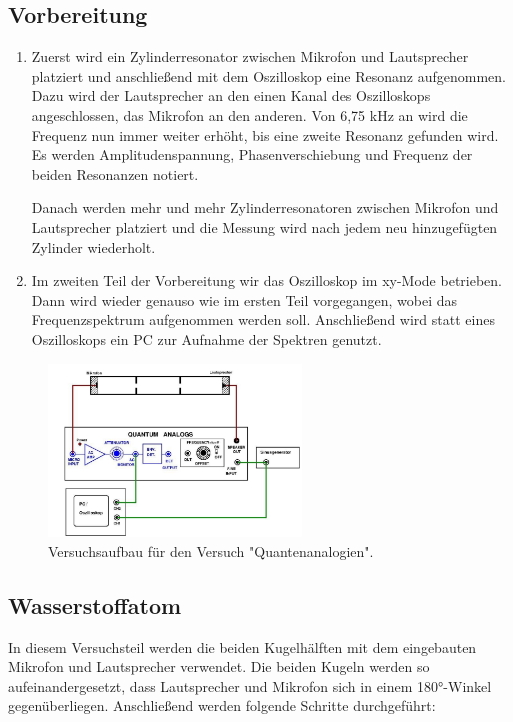 \subsection{Vorbereitung}

\begin{enumerate}
\item Zuerst wird ein Zylinderresonator zwischen Mikrofon und Lautsprecher platziert und anschließend mit dem Oszilloskop eine
Resonanz aufgenommen. Dazu wird der Lautsprecher an den einen Kanal des Oszilloskops angeschlossen, das Mikrofon an den
anderen. Von 6,75 kHz an wird die Frequenz nun immer weiter erhöht, bis eine zweite Resonanz gefunden wird.
Es werden Amplitudenspannung, Phasenverschiebung und Frequenz der beiden Resonanzen notiert.

Danach werden mehr und mehr Zylinderresonatoren zwischen Mikrofon und Lautsprecher platziert und die Messung wird
nach jedem neu hinzugefügten Zylinder wiederholt.

\item Im zweiten Teil der Vorbereitung wir das Oszilloskop im xy-Mode betrieben. Dann wird wieder genauso wie im ersten Teil
vorgegangen, wobei das Frequenzspektrum aufgenommen werden soll. Anschließend wird statt eines Oszilloskops ein PC zur
Aufnahme der Spektren genutzt.
\end{enumerate}

\begin{figure}
\centering
\includegraphics[width=0.6\textwidth]{versuchsaufbau.png}
\caption{Versuchsaufbau für den Versuch "Quantenanalogien". \cite[3]{anleitung}}
\label{fig:versuchsaufbau}
\end{figure}

\subsection{Wasserstoffatom}

In diesem Versuchsteil werden die beiden Kugelhälften mit dem eingebauten Mikrofon und Lautsprecher verwendet. Die beiden
Kugeln werden so aufeinandergesetzt, dass Lautsprecher und Mikrofon sich in einem 180°-Winkel gegenüberliegen. Anschließend
werden folgende Schritte durchgeführt:

